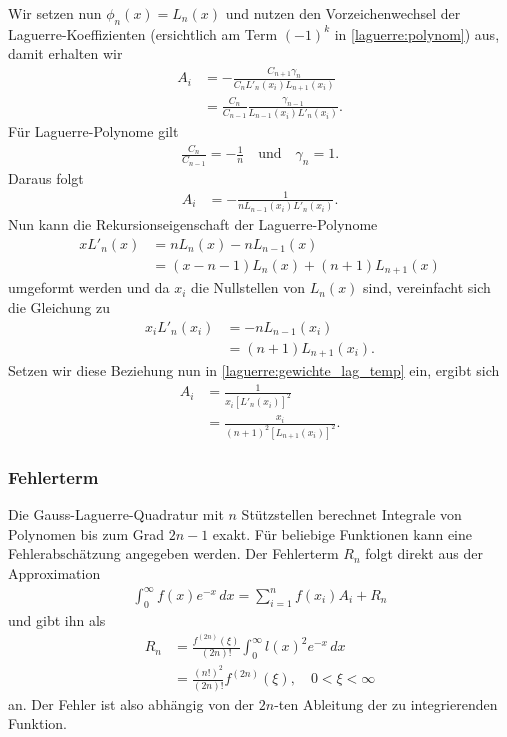 Wir setzen nun $\phi_n(x) = L_n(x)$ und
nutzen den Vorzeichenwechsel der Laguerre-Koeffizienten
(ersichtlich am Term $(-1)^k$ in \eqref{laguerre:polynom})
aus,
damit erhalten wir
\begin{align*}
A_i
 & =
-\frac{C_{n+1} \gamma_n}{C_n L'_n(x_i) L_{n+1} (x_i)}
\\
 & = \frac{C_n}{C_{n-1}} \frac{\gamma_{n-1}}{L_{n-1}(x_i) L'_n(x_i)}
.
\end{align*}
Für Laguerre-Polynome gilt
\begin{align*}
\frac{C_n}{C_{n-1}}
=
-\frac{1}{n}
\quad \text{und} \quad
\gamma_n
=
1
.
\end{align*}
Daraus folgt
\begin{align}
A_i
 & =
- \frac{1}{n L_{n-1}(x_i) L'_n(x_i)}
\label{laguerre:gewichte_lag_temp}
.
\end{align}
Nun kann die Rekursionseigenschaft der Laguerre-Polynome
%
\cite{laguerre:hildebrand2013introduction}
\begin{align*}
x L'_n(x)
 & =
n L_n(x) - n L_{n-1}(x)
\\
 & = (x - n - 1) L_n(x) + (n + 1) L_{n+1}(x)
\end{align*}
umgeformt werden und da $x_i$ die Nullstellen von $L_n(x)$ sind,
vereinfacht sich die Gleichung zu
\begin{align*}
x_i L'_n(x_i)
 & =
- n L_{n-1}(x_i)
\\
 & =
(n + 1) L_{n+1}(x_i)
.
\end{align*}
Setzen wir diese Beziehung nun in \eqref{laguerre:gewichte_lag_temp} ein,
ergibt sich
\begin{align}
\nonumber
A_i
 & =
\frac{1}{x_i \left[ L'_n(x_i) \right]^2}
\\
 & =
\frac{x_i}{(n+1)^2 \left[ L_{n+1}(x_i) \right]^2}
.
\label{laguerre:quadratur_gewichte}
\end{align}

\subsubsection{Fehlerterm}
Die Gauss-Laguerre-Quadratur mit $n$ Stützstellen berechnet Integrale
von Polynomen bis zum Grad $2n - 1$ exakt.
Für beliebige Funktionen kann eine Fehlerabschätzung angegeben werden.
Der Fehlerterm $R_n$ folgt direkt aus der Approximation
\begin{align*}
\int_0^{\infty} f(x) e^{-x} \, dx
=
\sum_{i=1}^n f(x_i) A_i + R_n
\end{align*}
und \cite{laguerre:abramowitz+stegun} gibt ihn als
\begin{align}
R_n
 & =
\frac{f^{(2n)}(\xi)}{(2n)!} \int_0^\infty l(x)^2 e^{-x}\,dx
\\
 & =
\frac{(n!)^2}{(2n)!} f^{(2n)}(\xi)
,\quad
0 < \xi < \infty
\label{laguerre:lag_error}
\end{align}
an.
Der Fehler ist also abhängig von der $2n$-ten Ableitung
der zu integrierenden Funktion.
